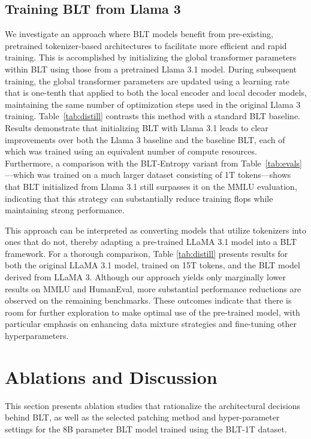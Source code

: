 \subsection{Training {\textsc BLT} from Llama 3}
\label{sec:distillation}
We investigate an approach where {\textsc BLT} models benefit from pre-existing, pretrained tokenizer-based architectures to facilitate more efficient and rapid training. This is accomplished by initializing the global transformer parameters within {\textsc BLT} using those from a pretrained Llama 3.1 model. During subsequent training, the global transformer parameters are updated using a learning rate that is one-tenth that applied to both the local encoder and local decoder models, maintaining the same number of optimization steps used in the original Llama 3 training. Table~\ref{tab:distill} contrasts this method with a standard {\textsc BLT} baseline. Results demonstrate that initializing {\textsc BLT} with Llama 3.1 leads to clear improvements over both the Llama 3 baseline and the baseline {\textsc BLT}, each of which was trained using an equivalent number of compute resources. Furthermore, a comparison with the {\textsc BLT}-Entropy variant from Table~\ref{tab:evals}—which was trained on a much larger dataset consisting of 1T tokens—shows that {\textsc BLT} initialized from Llama 3.1 still surpasses it on the MMLU evaluation, indicating that this strategy can substantially reduce training flops while maintaining strong performance.

This approach can be interpreted as converting models that utilize tokenizers into ones that do not, thereby adapting a pre-trained LLaMA 3.1 model into a {\textsc BLT} framework. For a thorough comparison, Table \ref{tab:distill} presents results for both the original LLaMA 3.1 model, trained on 15T tokens, and the {\textsc BLT} model derived from LLaMA 3. Although our approach yields only marginally lower results on MMLU and HumanEval, more substantial performance reductions are observed on the remaining benchmarks. These outcomes indicate that there is room for further exploration to make optimal use of the pre-trained model, with particular emphasis on enhancing data mixture strategies and fine-tuning other hyperparameters.

\section{Ablations and Discussion}
\label{section:ablations}
This section presents ablation studies that rationalize the architectural decisions behind {\textsc BLT}, as well as the selected patching method and hyper-parameter settings for the 8B parameter {\textsc BLT} model trained using the {\textsc BLT}-1T dataset.

